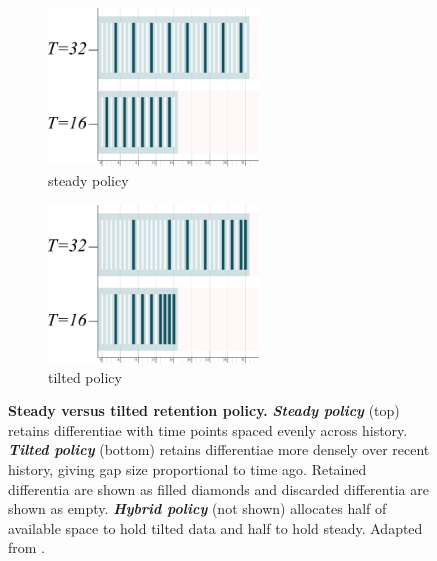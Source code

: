 \begin{figure}
\begin{minipage}{0.65\linewidth}
\begin{subfigure}{0.5\linewidth}
    \captionsetup{labelformat=prependbefore,labelsep=space}
  \includegraphics[height=1.65in]{img/steady-bars}
  \caption{\footnotesize steady policy}
  \label{fig:steady-vs-tilted-schematic:steady}
\end{subfigure}%
\begin{subfigure}{0.5\linewidth}
  \centering
  \includegraphics[height=1.65in, trim={10cm 0 0 0}, clip]{img/tilted-bars}
  \caption{\footnotesize tilted policy}
  \label{fig:steady-vs-tilted-schematic:tilted}
\end{subfigure}%
\end{minipage}%
\begin{minipage}{0.35\textwidth}
  \caption{%
  \textbf{Steady versus tilted retention policy.}
  \footnotesize
  \textbf{\textit{Steady policy}} (top) retains differentiae with time points spaced evenly across history.
  \textbf{\textit{Tilted policy}} (bottom) retains differentiae more densely over recent history, giving gap size proportional to time ago.
  Retained differentia are shown as filled diamonds and discarded differentia are shown as empty.
  \textbf{\textit{Hybrid policy}} (not shown) allocates half of available space to hold tilted data and half to hold steady.
  Adapted from \citep{moreno2025testing}.
  }
  \label{fig:steady-vs-tilted-schematic}
\end{minipage}
\end{figure}
